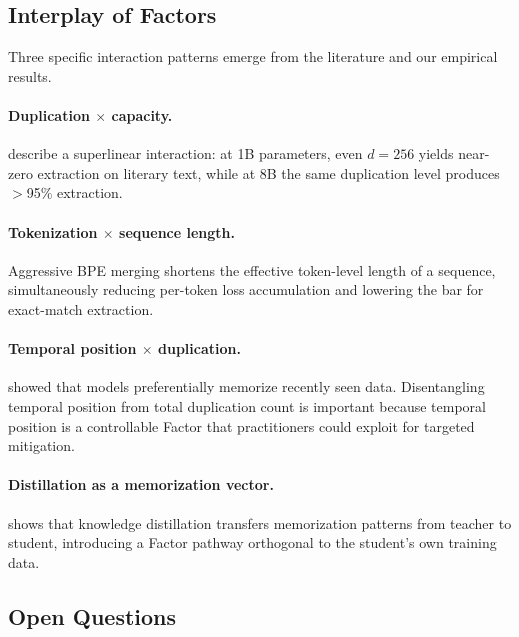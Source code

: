 \documentclass[11pt]{article}
\begin{document}
\subsection{Interplay of Factors}

Three specific interaction patterns emerge from the literature and our
empirical results.

\paragraph{Duplication $\times$ capacity.}
\citet{hernandez2022scaling} describe a superlinear interaction: at 1B
parameters, even $d{=}256$ yields near-zero extraction on literary text,
while at 8B the same duplication level produces $>$95\% extraction.

\paragraph{Tokenization $\times$ sequence length.}
Aggressive BPE merging shortens the effective token-level length of a
sequence, simultaneously reducing per-token loss accumulation and lowering
the bar for exact-match extraction.

\paragraph{Temporal position $\times$ duplication.}
\citet{jagielski2023measuring} showed that models preferentially memorize
recently seen data.
Disentangling temporal position from total duplication count is important
because temporal position is a controllable Factor that practitioners could
exploit for targeted mitigation.

\paragraph{Distillation as a memorization vector.}
\citet{borkar2026memorizationdynamicsknowledgedistillation} shows that
knowledge distillation transfers memorization patterns from teacher to student,
introducing a Factor pathway orthogonal to the student's own training data.

\subsection{Open Questions}
\label{app:factors-open}
\end{document}
